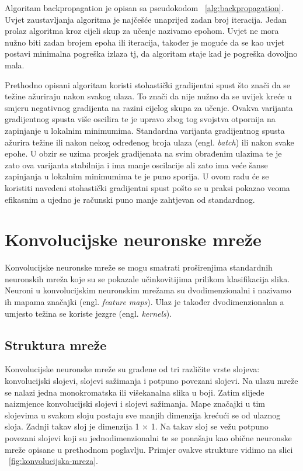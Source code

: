 \documentclass[times, utf8, zavrsni, numeric]{fer}
\begin{document}
Algoritam backpropagation je opisan sa pseudokodom ~\ref{alg:backpropagation}. Uvjet zaustavljanja algoritma je najčešće unaprijed zadan broj iteracija. Jedan prolaz algoritma kroz cijeli skup za učenje nazivamo epohom. Uvjet ne mora nužno biti zadan brojem epoha ili iteracija, također je moguće da se kao uvjet postavi minimalna pogreška izlaza tj, da algoritam staje kad je pogreška dovoljno mala.

Prethodno opisani algoritam koristi stohastički gradijentni spust što znači da se težine ažuriraju nakon svakog ulaza. To znači da nije nužno da se uvijek kreće u smjeru negativnog gradijenta na razini cijelog skupa za učenje. Ovakva varijanta gradijentnog spusta više oscilira te je upravo zbog tog svojstva otpornija na zapinjanje u lokalnim minimumima. Standardna varijanta gradijentnog spusta ažurira težine ili nakon nekog određenog broja ulaza (engl. \textit{batch}) ili nakon svake epohe. U obzir se uzima prosjek gradijenata na svim obrađenim ulazima te je zato ova varijanta stabilnija i ima manje oscilacije ali zato ima veće šanse zapinjanja u lokalnim minimumima te je puno sporija. U ovom radu će se koristiti navedeni stohastički gradijentni spust pošto se u praksi pokazao veoma efikasnim a ujedno je računski puno manje zahtjevan od standardnog.

\chapter{Konvolucijske neuronske mreže}
Konvolucijske neuronske mreže se mogu smatrati proširenjima standardnih neuronskih mreža koje su se pokazale učinkovitijima prilikom klasifikacija slika. Neuroni u konvolucijskim neuronskim mrežama su dvodimenzionalni i nazivamo ih mapama značajki (engl. \textit{feature maps}). Ulaz je također dvodimenzionalan a umjesto težina se koriste jezgre (engl. \textit{kernels}).

\section{Struktura mreže}
Konvolucijske neuronske mreže su građene od tri različite vrste slojeva: konvolucijski slojevi, slojevi sažimanja i potpuno povezani slojevi. Na ulazu mreže se nalazi jedna monokromatska ili višekanalna slika u boji. Zatim slijede naizmjence konvolucijski slojevi i slojevi sažimanja. Mape značajki u tim slojevima u svakom sloju postaju sve manjih dimenzija krećući se od ulaznog sloja. Zadnji takav sloj je dimenzija 1 $\times$ 1. Na takav sloj se vežu potpuno povezani slojevi koji su jednodimenzionalni te se ponašaju kao obične neuronske mreže opisane u prethodnom poglavlju. Primjer ovakve strukture vidimo na slici ~\ref{fig:konvolucijska-mreza}.
\end{document}
